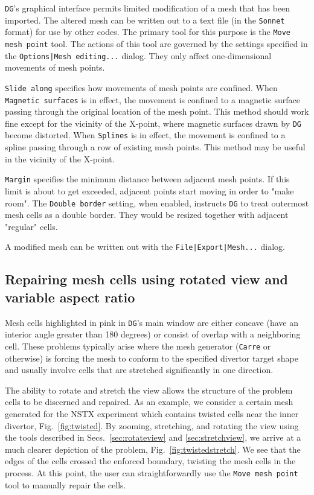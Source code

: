 \documentclass[a4paper,10pt]{report}
\begin{document}
{\tt DG}'s graphical interface permits limited modification of a mesh that has
been imported.  The altered mesh can be written out to a text file (in
the {\tt Sonnet} format) for use by other codes.  The primary tool for this
purpose is the {\tt Move mesh point} tool.  The actions of this tool
are governed by the settings specified in the
{\tt Options|Mesh editing...} dialog.
They only affect one-dimensional movements of mesh points.

{\tt Slide along} specifies how movements of mesh points are confined.
When {\tt Magnetic surfaces} is in effect, the movement is confined to a
magnetic surface passing through the original location of the mesh
point. This method should work fine except for the vicinity of the
X-point, where magnetic surfaces drawn by {\tt DG} become distorted.
When {\tt Splines} is in effect, the movement is confined to a spline
passing through a row of existing mesh points.  This method may be
useful in the vicinity of the X-point.

{\tt Margin} specifies the minimum distance between adjacent mesh
points. If this limit is about to get exceeded, adjacent points start
moving in order to "make room".
The {\tt Double border} setting, when enabled, instructs {\tt DG} to treat
outermost mesh cells as a double border. They would be resized
together with adjacent "regular" cells.

A modified mesh can be written out with the
{\tt File|Export|Mesh...} dialog.

\subsection{Repairing mesh cells using rotated view and variable aspect ratio}

Mesh cells highlighted in pink in {\tt DG}'s main window are either concave
(have an interior angle greater than 180 degrees) or consist of
overlap with a neighboring cell.  These problems typically arise where
the mesh generator ({\tt Carre} or otherwise) is forcing the mesh to
conform to the specified divertor target shape and usually involve
cells that are stretched significantly in one direction.

The ability to rotate and stretch the view allows the structure of the
problem cells to be discerned and repaired.
As an example, we consider a certain mesh generated for the NSTX experiment
which contains twisted cells near the inner divertor, Fig.~\ref{fig:twisted}.
By zooming, stretching, and rotating the view using the tools
described in Secs.~\ref{sec:rotateview} and \ref{sec:stretchview},
we arrive at a much clearer depiction
of the problem, Fig.~\ref{fig:twistedstretch}.
We see that the edges of the cells crossed the enforced boundary,
twisting the mesh cells in the process.  At this point, the user can
straightforwardly use the {\tt Move mesh point}
tool to manually repair the cells.
\end{document}
